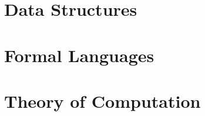 

\section{Data Structures}


\section{Formal Languages}











\section{Theory of Computation}



